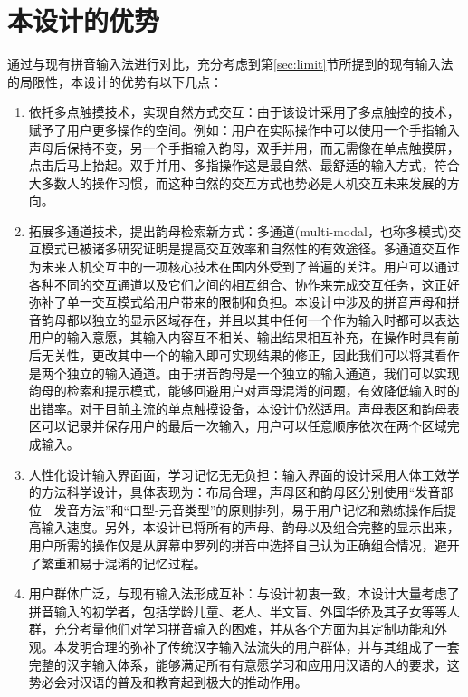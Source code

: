 
  \section{本设计的优势}

  通过与现有拼音输入法进行对比，充分考虑到第\ref{sec:limit}节所提到的现有输入法的局限性，本设计的优势有以下几点：

  \begin{enumerate}
  \item
  依托多点触摸技术，实现⾃然⽅式交互：由于该设计采用了多点触控的技术，赋予了用户更多操作的空间。例如：用户在实际操作中可以使用一个手指输入声母后保持不变，另一个手指输入韵母，双手并用，而无需像在单点触摸屏，点击后马上抬起。双⼿并用、多指操作这是最自然、最舒适的输⼊方式，符合⼤多数⼈的操作习惯，而这种自然的交互⽅式也势必是人机交互未来发展的⽅向。

  \item
  拓展多通道技术，提出韵母检索新⽅式：多通道(multi-modal，也称多模式)交互模式已被诸多研究证明是提高交互效率和自然性的有效途径。多通道交互作为未来人机交互中的一项核心技术在国内外受到了普遍的关注。\supercite{dsh,lmz}用户可以通过各种不同的交互通道以及它们之间的相互组合、协作来完成交互任务，这正好弥补了单一交互模式给用户带来的限制和负担。本设计中涉及的拼⾳声母和拼⾳韵母都以独立的显示区域存在，并且以其中任何一个作为输⼊时都可以表达⽤户的输⼊意愿，其输入内容互不相关、输出结果相互补充，在操作时具有前后⽆关性，更改其中一个的输⼊即可实现结果的修正，因此我们可以将其看作是两个独立的输⼊通道。由于拼⾳韵母是一个独⽴的输⼊通道，我们可以实现韵母的检索和提示模式，能够回避⽤户对声母混淆的问题，有效降低输入时的出错率。对于⽬前主流的单点触摸设备，本设计仍然适用。声母表区和韵母表区可以记录并保存⽤户的最后一次输入，用户可以任意顺序依次在两个区域完成输入。

  \item
  人性化设计输入界⾯面，学习记忆⽆无负担：输入界面的设计采用人体工效学的方法科学设计，具体表现为：布局合理，声母区和韵母区分别使用“发音部位－发音方法”和“口型-元音类型”的原则排列，易于用户记忆和熟练操作后提高输入速度。另外，本设计已将所有的声母、韵母以及组合完整的显示出来，用户所需的操作仅是从屏幕中罗列的拼⾳中选择⾃己认为正确组合情况，避开了繁重和易于混淆的记忆过程。

  \item
  ⽤户群体广泛，与现有输⼊法形成互补：与设计初衷一致，本设计大量考虑了拼音输入的初学者，包括学龄儿童、老人、半文盲、外国华侨及其子女等等人群，充分考量他们对学习拼音输入的困难，并从各个方面为其定制功能和外观。本发明合理的弥补了传统汉字输入法流失的⽤户群体，并与其组成了一套完整的汉字输⼊体系，能够满足所有有意愿学习和应⽤用汉语的人的要求，这势必会对汉语的普及和教育起到极大的推动作用。
  \end{enumerate}
